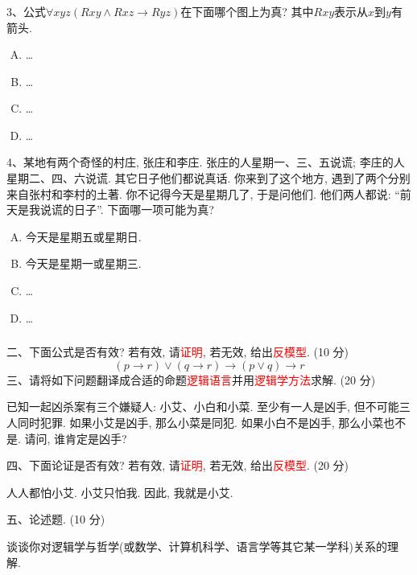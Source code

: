 \documentclass[UTF8,11pt,colorlinks,aspectratio=43]{beamer}%
\begin{document}
\begin{frame}\frametitle{}
\begin{block}{}
3、公式$\forall xyz(Rxy\wedge Rxz\to Ryz)$在下面哪个图上为真? 其中$Rxy$表示从$x$到$y$有箭头.
\begin{enumerate}[A.]\setlength{\itemsep}{-2pt}
\item \dots
\item \dots
\item \dots
\item \dots
\end{enumerate}
\end{block}
\begin{block}{}
4、某地有两个奇怪的村庄, 张庄和李庄. 张庄的人星期一、三、五说谎; 李庄的人星期二、四、六说谎. 其它日子他们都说真话. 你来到了这个地方, 遇到了两个分别来自张村和李村的土著. 你不记得今天是星期几了, 于是问他们. 他们两人都说: ``前天是我说谎的日子''. 下面哪一项可能为真?
\begin{enumerate}[A.]\setlength{\itemsep}{-2pt}
\item 今天是星期五或星期日.
\item 今天是星期一或星期三.
\item \dots
\item \dots
\end{enumerate}
\end{block}
\end{frame}

\begin{frame}\frametitle{}
二、下面公式是否有效? 若有效, 请\textcolor{red}{证明}, 若无效, 给出\textcolor{red}{反模型}. (10 分)
\[(p\to r)\vee(q\to r)\to(p\vee q)\to r\]
三、请将如下问题翻译成合适的命题\textcolor{red}{逻辑语言}并用\textcolor{red}{逻辑学方法}求解. (20 分)
\begin{block}{}
已知一起凶杀案有三个嫌疑人: 小艾、小白和小菜. 至少有一人是凶手, 但不可能三人同时犯罪. 如果小艾是凶手, 那么小菜是同犯. 如果小白不是凶手, 那么小菜也不是. 请问, 谁肯定是凶手? 
\end{block}
四、下面论证是否有效? 若有效, 请\textcolor{red}{证明}, 若无效, 给出\textcolor{red}{反模型}. (20 分)
\begin{block}{}
 人人都怕小艾. 小艾只怕我. 因此, 我就是小艾. 
\end{block}
五、论述题. (10 分)
\begin{block}{}
 谈谈你对逻辑学与哲学(或数学、计算机科学、语言学等其它某一学科)关系的理解.
\end{block}
\end{frame}
\end{document}
